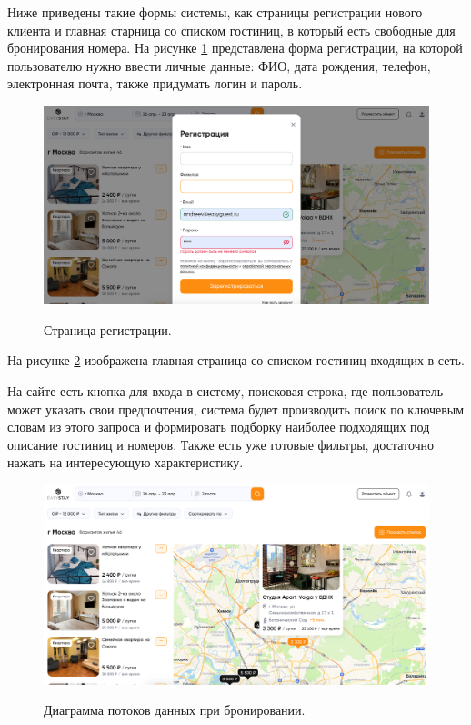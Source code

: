Ниже приведены такие формы системы, как страницы регистрации нового клиента и главная старница со списком гостиниц, в который есть свободные для бронирования номера. На рисунке \ref{fig:ui-reg} представлена форма регистрации, на которой пользователю нужно ввести личные данные: ФИО, дата рождения, телефон, электронная почта, также придумать логин и пароль. 

\begin{figure}[h]
	\begin{center}
		{\includegraphics[scale = 0.3]{img/ui/registration.png}}
		\caption{Страница регистрации.}
		\label{fig:ui-reg}
	\end{center}
\end{figure} 

На рисунке \ref{fig:ui-hotels} изображена главная страница со списком гостиниц входящих в сеть. 

На сайте есть кнопка для входа в систему, поисковая строка, где пользователь может указать свои предпочтения, система будет производить поиск по ключевым словам из этого запроса и формировать подборку наиболее подходящих под описание гостиниц и номеров. Также есть уже готовые фильтры, достаточно нажать на интересующую характеристику.

\begin{figure}[h]
	\begin{center}
		{\includegraphics[scale = 0.3]{img/ui/hotels.png}}
		\caption{Диаграмма потоков данных при бронировании.}
		\label{fig:ui-hotels}
	\end{center}
\end{figure} 

